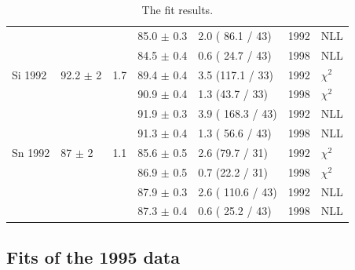 \begin{table}[H]
\begin{center}
\begin{tabular}{|l||l|l|l|l|l|l|}
                &                &     & 85.0 $\pm$ 0.3 & 2.0 ( 86.1 / 43) & 1992 & NLL \\
                &                &     & 84.5 $\pm$ 0.4 & 0.6 ( 24.7 / 43) & 1998 & NLL \\
      \hline                           
       Si 1992   & 92.2 $\pm$ 2   & 1.7 & 89.4 $\pm$ 0.4 & 3.5 (117.1 / 33) & 1992 & $\chi^2$ \\  
                 &                &     & 90.9 $\pm$ 0.4 & 1.3 (43.7 / 33)  & 1998 & $\chi^2$ \\  
                                        
                &                &     & 91.9 $\pm$ 0.3 & 3.9 ( 168.3 / 43) & 1992 & NLL \\
                &                &     & 91.3 $\pm$ 0.4 & 1.3 ( 56.6 / 43) & 1998 & NLL \\
      \hline                           
       Sn 1992   & 87   $\pm$ 2   & 1.1 & 85.6 $\pm$ 0.5 & 2.6 (79.7 / 31)  & 1992 & $\chi^2$ \\  
                 &                &     & 86.9 $\pm$ 0.5 & 0.7 (22.2 / 31)  & 1998 & $\chi^2$ \\  
                                        
                &                &     & 87.9 $\pm$ 0.3 & 2.6 ( 110.6 / 43) & 1992 & NLL \\
                &                &     & 87.3 $\pm$ 0.4 & 0.6 ( 25.2 / 43) & 1998 & NLL \\
      \hline                           
    \end{tabular}
  \end{center}
  \caption{The fit results.}
  \label{table:fits1992}
\end{table}

\subsection { Fits of the 1995 data }

